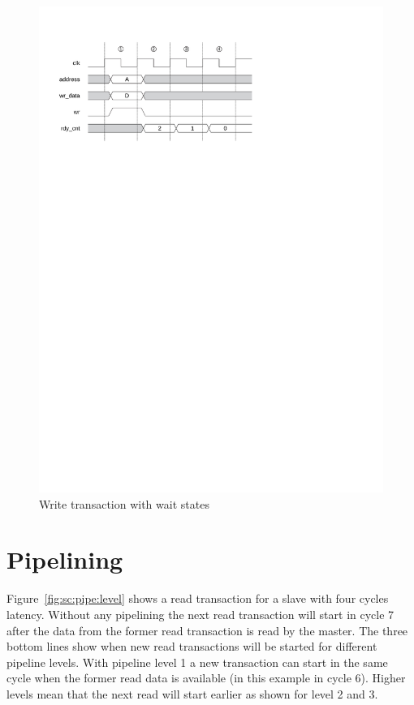 \documentclass[a4paper,12pt]{scrartcl}
\begin{document}
\begin{figure}
    \centering
    \includegraphics{figures/sc_wr_ws}
    \caption{Write transaction with wait states}
    \label{fig:sc:wr:ws}
\end{figure}



\section{Pipelining}

Figure~\ref{fig:sc:pipe:level} shows a read transaction for a slave
with four cycles latency. Without any pipelining the next read
transaction will start in cycle 7 after the data from the former
read transaction is read by the master. The three bottom lines show
when new read transactions will be started for different pipeline
levels. With pipeline level 1 a new transaction can start in the
same cycle when the former read data is available (in this example
in cycle 6). Higher levels mean that the next read will start
earlier as shown for level 2 and 3.
\end{document}
